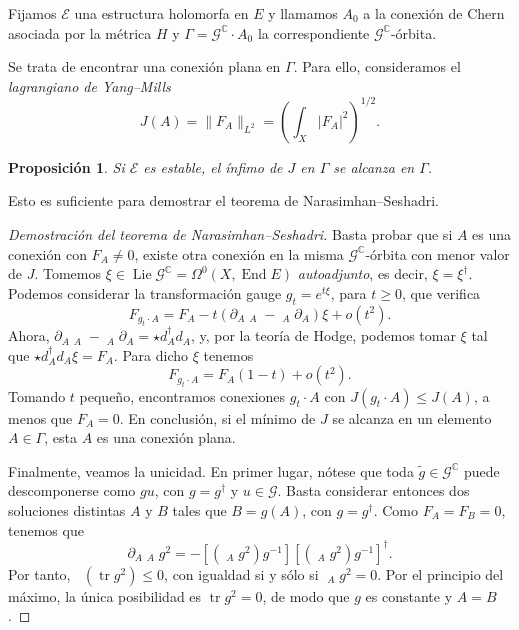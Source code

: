 \documentclass[12pt, a4paper]{amsart}
\newcommand\CC{\mathbb{C}}
\newcommand\GG{\mathcal{G}}
\newcommand\EE{\mathscr{E}}
\DeclareMathOperator\tr{tr}
\DeclareMathOperator\End{End}
\DeclareMathOperator\Lie{Lie}
\DeclareMathOperator\delbar{\bar{\partial}}
\newtheorem{prop}[thm]{Proposición}
\theoremstyle{remark} \newtheorem{rmk}[thm]{Observación}
\theoremstyle{remark} \newtheorem{rmks}[thm]{Observaciones}
\theoremstyle{definition} \newtheorem{defn}[thm]{Definición}
\theoremstyle{definition} \newtheorem{ejs}[thm]{Ejemplos}
\theoremstyle{definition} \newtheorem{ej}[thm]{Ejemplo}
\begin{document}
Fijamos $\EE$ una estructura holomorfa en $E$ y llamamos $A_0$ a la conexión de Chern asociada por la métrica $H$ y $\Gamma=\GG^\CC\cdot A_0$ la correspondiente $\GG^\CC$-órbita.

Se trata de encontrar una conexión plana en $\Gamma$. Para ello, consideramos el \emph{lagrangiano de Yang--Mills}
\begin{equation*}
	J(A)=\lVert F_A \rVert_{L^2} = \left( \int_X |F_A|^2 \right)^{1/2}.
\end{equation*} 

\begin{prop}\label{infimo}
Si $\EE$ es estable, el ínfimo de $J$ en $\Gamma$ se alcanza en $\Gamma$.	
\end{prop}

Esto es suficiente para demostrar el teorema de Narasimhan--Seshadri.

\begin{proof}[Demostración del teorema de Narasimhan--Seshadri]
	Basta probar que si $A$ es una conexión con $F_A\neq 0$, existe otra conexión en la misma $\GG^\CC$-órbita con menor valor de $J$.
	Tomemos $\xi \in \Lie \GG^\CC=\Omega^0(X,\End E)$ \emph{autoadjunto}, es decir, $\xi=\xi^\dagger$. Podemos considerar la transformación gauge  $g_t=e^{t\xi}$, para $t\geq 0$, que verifica
	\begin{equation*}
		F_{g_t\cdot A}=F_A - t(\partial_A\delbar_A - \delbar_A \partial_A)\xi + o(t^2).
	\end{equation*} 
	Ahora, $\partial_A\delbar_A - \delbar_A \partial_A=\star d_A^\dagger d_A$, y, por la teoría de Hodge, podemos tomar  $\xi$ tal que $\star d_A^\dagger d_A \xi = F_A$. Para dicho $\xi$ tenemos
	\begin{equation*}
		F_{g_t \cdot A} = F_A(1-t) + o(t^2).
	\end{equation*} 
	Tomando $t$ pequeño, encontramos conexiones $g_t \cdot A$ con $J(g_t \cdot A)\leq J(A)$, a menos que $F_A=0$. En conclusión, si el mínimo de $J$ se alcanza en un elemento $A \in \Gamma$, esta $A$ es una conexión plana.

	Finalmente, veamos la unicidad. En primer lugar, nótese que toda $\tilde{g} \in \GG^\CC$ puede descomponerse como $gu$, con  $g=g^\dagger$ y  $u\in \GG$. Basta considerar entonces dos soluciones distintas  $A$ y $B$ tales que $B=g(A)$, con $g=g^\dagger$. Como $F_A =F_B=0$, tenemos que $$\partial_A\delbar_A g^2 = - [(\delbar_A g^2)g^{-1}][(\delbar_A g^2)g^{-1}]^\dagger.$$ 
	Por tanto, $\delbar(\tr g^2)\leq 0$, con igualdad si y sólo si $\delbar_A g^2=0$. Por el principio del máximo, la única posibilidad es $\tr g^2=0$, de modo que $g$ es constante y $A=B$.
\end{proof}
\end{document}
